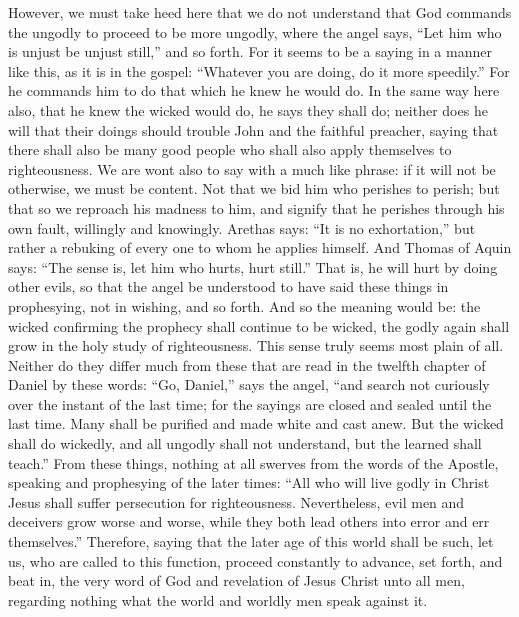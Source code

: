 However, we must take heed here that we do not understand that God commands the ungodly to proceed to be more ungodly, where the angel says, “Let him who is unjust be unjust still,” and so forth. For it seems to be a saying in a manner like this, as it is in the gospel: “Whatever you are doing, do it more speedily.” For he commands him to do that which he knew he would do. In the same way here also, that he knew the wicked would do, he says they shall do; neither does he will that their doings should trouble John and the faithful preacher, saying that there shall also be many good people who shall also apply themselves to righteousness. We are wont also to say with a much like phrase: if it will not be otherwise, we must be content. Not that we bid him who perishes to perish; but that so we reproach his madness to him, and signify that he perishes through his own fault, willingly and knowingly. Arethas says: “It is no exhortation,” but rather a rebuking of every one to whom he applies himself. And Thomas of Aquin says: “The sense is, let him who hurts, hurt still.” That is, he will hurt by doing other evils, so that the angel be understood to have said these things in prophesying, not in wishing, and so forth. And so the meaning would be: the wicked confirming the prophecy shall continue to be wicked, the godly again shall grow in the holy study of righteousness. This sense truly seems most plain of all. Neither do they differ much from these that are read in the twelfth chapter of Daniel by these words: “Go, Daniel,” says the angel, “and search not curiously over the instant of the last time; for the sayings are closed and sealed until the last time. Many shall be purified and made white and cast anew. But the wicked shall do wickedly, and all ungodly shall not understand, but the learned shall teach.” From these things, nothing at all swerves from the words of the Apostle, speaking and prophesying of the later times: “All who will live godly in Christ Jesus shall suffer persecution for righteousness. Nevertheless, evil men and deceivers grow worse and worse, while they both lead others into error and err themselves.” Therefore, saying that the later age of this world shall be such, let us, who are called to this function, proceed constantly to advance, set forth, and beat in, the very word of God and revelation of Jesus Christ unto all men, regarding nothing what the world and worldly men speak against it.

